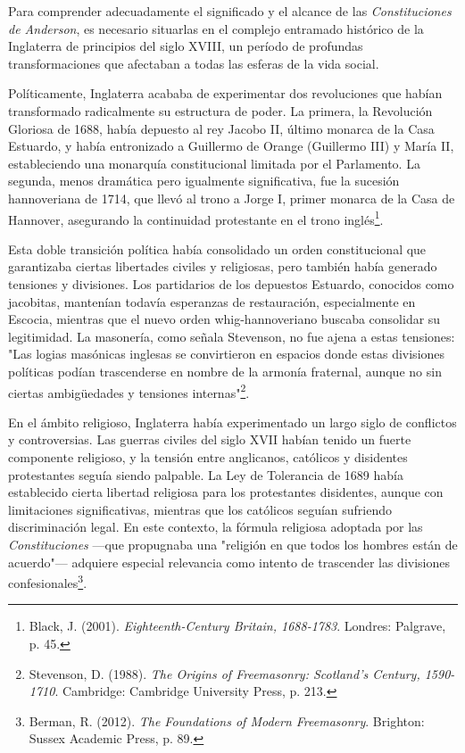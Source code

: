 \documentclass[a4paper,12pt,twoside]{book}
\begin{document}
Para comprender adecuadamente el significado y el alcance de las \textit{Constituciones de Anderson}, es necesario situarlas en el complejo entramado histórico de la Inglaterra de principios del siglo XVIII, un período de profundas transformaciones que afectaban a todas las esferas de la vida social.

Políticamente, Inglaterra acababa de experimentar dos revoluciones que habían transformado radicalmente su estructura de poder. La primera, la Revolución Gloriosa de 1688, había depuesto al rey Jacobo II, último monarca de la Casa Estuardo, y había entronizado a Guillermo de Orange (Guillermo III) y María II, estableciendo una monarquía constitucional limitada por el Parlamento. La segunda, menos dramática pero igualmente significativa, fue la sucesión hannoveriana de 1714, que llevó al trono a Jorge I, primer monarca de la Casa de Hannover, asegurando la continuidad protestante en el trono inglés\footnote{Black, J. (2001). \textit{Eighteenth-Century Britain, 1688-1783}. Londres: Palgrave, p. 45.}.

Esta doble transición política había consolidado un orden constitucional que garantizaba ciertas libertades civiles y religiosas, pero también había generado tensiones y divisiones. Los partidarios de los depuestos Estuardo, conocidos como jacobitas, mantenían todavía esperanzas de restauración, especialmente en Escocia, mientras que el nuevo orden whig-hannoveriano buscaba consolidar su legitimidad. La masonería, como señala Stevenson, no fue ajena a estas tensiones: "Las logias masónicas inglesas se convirtieron en espacios donde estas divisiones políticas podían trascenderse en nombre de la armonía fraternal, aunque no sin ciertas ambigüedades y tensiones internas"\footnote{Stevenson, D. (1988). \textit{The Origins of Freemasonry: Scotland's Century, 1590-1710}. Cambridge: Cambridge University Press, p. 213.}.

En el ámbito religioso, Inglaterra había experimentado un largo siglo de conflictos y controversias. Las guerras civiles del siglo XVII habían tenido un fuerte componente religioso, y la tensión entre anglicanos, católicos y disidentes protestantes seguía siendo palpable. La Ley de Tolerancia de 1689 había establecido cierta libertad religiosa para los protestantes disidentes, aunque con limitaciones significativas, mientras que los católicos seguían sufriendo discriminación legal. En este contexto, la fórmula religiosa adoptada por las \textit{Constituciones} —que propugnaba una "religión en que todos los hombres están de acuerdo"— adquiere especial relevancia como intento de trascender las divisiones confesionales\footnote{Berman, R. (2012). \textit{The Foundations of Modern Freemasonry}. Brighton: Sussex Academic Press, p. 89.}.
\end{document}
